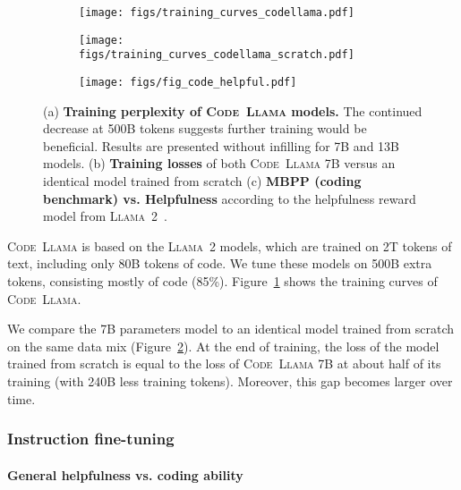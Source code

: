 \documentclass[10pt]{article}
\newcommand{\model}{\textsc{Code~Llama}\xspace}
\newcommand{\llamavtwo}{\textsc{Llama~2}\xspace}
\begin{document}
\begin{figure}[t!]
\centering
\begin{subfigure}[T]{0.32\linewidth}
    \centering
    \texttt{[image: figs/training\_curves\_codellama.pdf]} \caption{
\label{fig:training_curves}}
\end{subfigure}
\hfill
\begin{subfigure}[T]{0.32\linewidth}
    \centering
    \texttt{[image: figs/training\_curves\_codellama\_scratch.pdf]} \caption{
    \label{fig:curves_scratch_ablation_loss}}
\end{subfigure}
\hfill
\begin{subfigure}[T]{0.32\linewidth}
    \centering
    \texttt{[image: figs/fig\_code\_helpful.pdf]}
    \caption{
    \label{fig:helpfulness_vs_mbpp}}
\end{subfigure}
\caption{(a) \textbf{Training perplexity of \model models.} The continued decrease at 500B tokens suggests further training would be beneficial. Results are presented without infilling for 7B and 13B models. (b) \textbf{Training losses} of both \model 7B versus an identical model trained from scratch (c) \textbf{MBPP (coding benchmark) vs. Helpfulness} according to the helpfulness reward model from \llamavtwo~\citep{touvron2023llamav2}.}
\end{figure}


\model is based on the \llamavtwo models, which are trained on 2T tokens of text, including only 80B tokens of code. 
We tune these models on 500B extra tokens, consisting mostly of code (85\%). 
Figure~\ref{fig:training_curves} shows the training curves of \model. 


We compare the 7B parameters model to an identical model trained from scratch on the same data mix (Figure~\ref{fig:curves_scratch_ablation_loss}). At the end of training, the loss of the model trained from scratch is equal to the loss of \model 7B at about half of its training (with 240B less training tokens). Moreover, this gap becomes larger over time. 


\subsubsection{Instruction fine-tuning}\label{sec:inst_results}
\paragraph{General helpfulness vs. coding ability}
\end{document}
